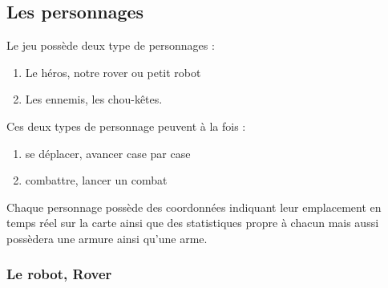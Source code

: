\documentclass[a4paper 12pts]{article}
\begin{document}
\subsection{Les personnages}

\vspace{1cm}


Le jeu possède deux type de personnages : 

\vspace{0.5cm}

\begin{enumerate}
	\item Le héros, notre rover ou petit robot
	\item Les ennemis, les chou-kêtes.
\end{enumerate}

\vspace{0.5cm}

Ces deux types de personnage peuvent à la fois :

\vspace{0.5cm}

\begin{enumerate}
	\item se déplacer, avancer case par case 
	\item combattre, lancer un combat
\end{enumerate}

\vspace{0.5cm}

Chaque personnage possède des coordonnées indiquant leur emplacement en temps réel sur la carte ainsi que des statistiques propre à chacun mais aussi possèdera une armure ainsi qu'une arme.

\newpage
\subsubsection{Le robot, Rover}
\vspace{1cm}
\end{document}
